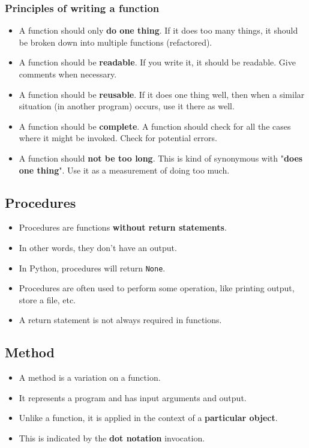 \documentclass[11pt]{article}
\begin{document}
\subsubsection{Principles of writing a function}
\label{sec:org4db2053}
\begin{itemize}
\item A function should only \textbf{do one thing}. If it does too many things, it should be broken down into multiple functions (refactored).
\item A function should be \textbf{readable}. If you write it, it should be readable. Give comments when necessary.
\item A function should be \textbf{reusable}. If it does one thing well, then when a similar situation (in another program) occurs, use it there as well.
\item A function should be \textbf{complete}. A function should check for all the cases where it might be invoked. Check for potential errors.
\item A function should \textbf{not be too long}. This is kind of synonymous with "\textbf{does one thing}". Use it as a measurement of doing too much.
\end{itemize}
\subsection{Procedures}
\label{sec:orgae3480b}
\begin{itemize}
\item Procedures are functions \textbf{without return statements}.
\item In other words, they don't have an output.
\item In Python, procedures will return \texttt{None}.
\item Procedures are often used to perform some operation, like printing output, store a file, etc.
\item A return statement is not always required in functions.
\end{itemize}
\subsection{Method}
\label{sec:orgbe668ac}
\begin{itemize}
\item A method is a variation on a function.
\item It represents a program and has input arguments and output.
\item Unlike a function, it is applied in the context of a \textbf{particular object}.
\item This is indicated by the \textbf{dot notation} invocation.
\end{itemize}
\end{document}
